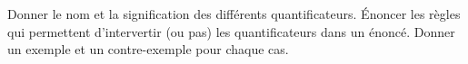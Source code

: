 %
%
 	\begin{tasks}
 		\task Donner le nom et  la signification des différents quantificateurs.
 		\task Énoncer les règles qui permettent d'intervertir (ou pas) les quantificateurs dans un énoncé.
 		\task Donner un exemple et un contre-exemple pour chaque cas.
 	\end{tasks}
